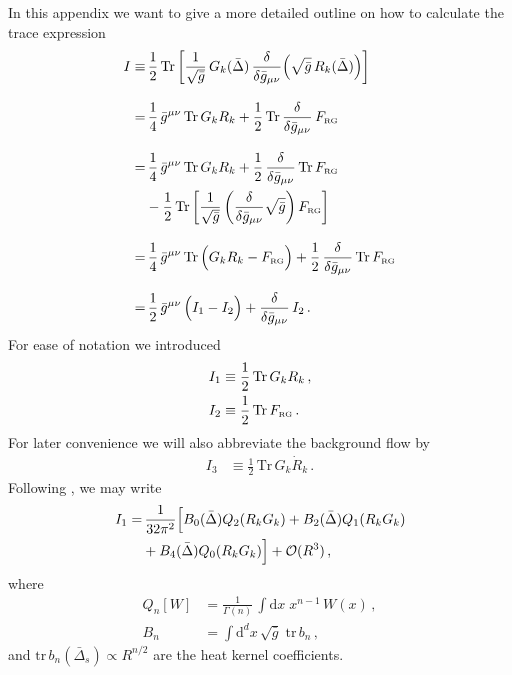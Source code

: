 \documentclass[11pt]{book} %
\newcommand{\tr}{\mathrm{tr}}
\newcommand{\Tr}{\mathrm{Tr}}
\begin{document}
{In this appendix we want to give a more detailed outline on how to
calculate the trace expression
\begin{align}\nonumber
 I \equiv&\, \frac 12 \, \Tr
  \left[
    \frac{1}{\sqrt{\bar g}} \, G_k(\bar \Delta) \, \frac{\delta}{\delta \bar g_{\mu\nu}} \Big( \sqrt{\bar g} \, R_k(\bar\Delta) \Big)
  \right]\\[2ex] \nonumber
=&\,
\frac 14 \, \bar g^{\mu\nu} \, \Tr \, G_k R_k + \frac 12 \, \Tr \, \frac{\delta}{\delta \bar g_{\mu\nu}} \, F_{\text{\tiny RG}}\\[2ex] \nonumber
=&\,
\frac 14 \, \bar g^{\mu\nu} \, \Tr \, G_k R_k
+ \frac 12 \, \frac{\delta}{\delta \bar g_{\mu\nu}} \, \Tr \, F_{\text{\tiny RG}} \\ \notag
&- \frac 12 \, \Tr \, \bigg[ \frac{1}{\sqrt{\bar g}} \left( \frac{\delta}{\delta \bar g_{\mu\nu}} \sqrt{\bar g} \right) F_{\text{\tiny RG}} \bigg] \\[2ex] \notag
=&\,
\frac 14 \, \bar g^{\mu\nu} \, \Tr \, \Big( G_k R_k - F_{\text{\tiny RG}} \Big)
+ \frac 12 \, \frac{\delta}{\delta \bar g_{\mu\nu}} \, \Tr \, F_{\text{\tiny RG}} \\[2ex]
=&\,
\frac 12 \, \bar g^{\mu\nu} \, \Big( I_1 - I_2 \Big) + \frac{\delta}{\delta \bar g_{\mu\nu}} \, I_2 \,.
\end{align}
For ease of notation we introduced
\begin{align}
  I_1 &\equiv \frac 12 \, \Tr \, G_k R_k \,, \\
  I_2 &\equiv \frac 12 \, \Tr \, F_{\text{\tiny RG}} \,.
\end{align}
For later convenience we will also abbreviate the background flow by
\begin{align}
  I_3 &\equiv \frac 12 \, \Tr \, G_k \dot R_k \,.
\end{align}
Following \cite{Codello:2008vh}, we may write
\begin{align}
  I_1 =& \,
  \frac{1}{32 \pi^2}
  \Big[ B_0(\bar\Delta) Q_2(R_kG_k)
    + B_2(\bar\Delta) Q_1(R_kG_k) \notag \\
  & + B_4(\bar\Delta) Q_0(R_kG_k)
  \Big]
  + \mathcal O (R^3) \,,
\end{align}
where
\begin{align}
  Q_n[W] &= \frac 1{\Gamma(n)} \, \int \mathrm dx \; x^{n-1} \, W(x) \,, \\
  B_n &= \int \mathrm d^dx \, \sqrt{\bar g} \; \tr \, b_n \,,
\end{align}
and $\tr \, b_n(\bar\Delta_s) \propto R^{n/2}$ are the  heat kernel coefficients.
}
\end{document}
